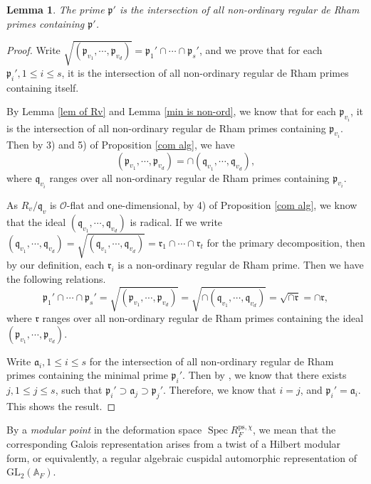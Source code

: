 \documentclass[a4paper, 12pt]{amsart}
\newtheorem{lem}[thm]{Lemma}
\DeclareMathOperator{\Spec}{Spec}
\def\ps{\mathrm{ps}}
\newcommand{\A}{\mathbb{A}}
\newcommand{\GL}{\mathrm{GL}}
\newcommand{\cO}{\mathcal{O}}
\newcommand{\kq}{\mathfrak{q}}
\newcommand{\kp}{\mathfrak{p}}
\begin{document}
    \begin{lem}\label{non-ord regular de Rham}
    	The prime $\kp'$ is the intersection of all non-ordinary regular de Rham primes containing $\kp'$.
    \end{lem}
    
    \begin{proof}
    	Write $\sqrt{(\kp_{v_1}, \cdots, \kp_{v_d})} = \kp_1' \cap \cdots \cap \kp_s'$, and we prove that for each $\kp_i', 1 \le i \le s$, it is the intersection of all non-ordinary regular de Rham primes containing itself.
    	
    	By Lemma \ref{lem of Rv} and Lemma  \ref{min is non-ord}, we know that for each $ \kp_{v_i}$, it is the intersection of all non-ordinary regular de Rham primes containing $ \kp_{v_i}$. Then by 3) and 5) of Proposition \ref{com alg}, we have $$
    	(\kp_{v_1}, \cdots, \kp_{v_d})= \cap (\kq_{v_1}, \cdots, \kq_{v_d}),$$
    	where $\kq_{v_i}$ ranges over all non-ordinary regular de Rham primes containing $ \kp_{v_i}$.
    	
    	As $R_v/\kq_v$ is $\cO$-flat and one-dimensional, by 4) of Proposition \ref{com alg}, we know that the ideal $(\kq_{v_1},  \cdots, \kq_{v_d})$ is radical. If we write $(\kq_{v_1},  \cdots, \kq_{v_d}) =\sqrt{(\kq_{v_1},  \cdots, \kq_{v_d})}= \mathfrak{r}_1 \cap \cdots \cap \mathfrak{r}_t$ for the primary decomposition, then by our definition, each $\mathfrak{r}_i$ is a non-ordinary regular de Rham prime. Then we have the following relations.
    	$$\kp_1' \cap \cdots \cap \kp_s'=\sqrt{(\kp_{v_1}, \cdots, \kp_{v_d})}=\sqrt{\cap (\kq_{v_1}, \cdots, \kq_{v_d})}= \sqrt{\cap \mathfrak{r}} = \cap \mathfrak{r},$$
        where $\mathfrak{r}$ ranges over all non-ordinary regular de Rham primes containing the ideal $(\kp_{v_1}, \cdots, \kp_{v_d})$.
        
        Write $\mathfrak{a}_i, 1 \le i \le s$ for the intersection of all non-ordinary regular de Rham primes containing the minimal prime $\kp_i'$. Then by \cite[Lemma 10.15.1]{stacks-project}, we know that there exists $j, 1 \le j \le s$, such that $\kp_i' \supset \mathfrak{a}_j \supset \kp_j'$. Therefore, we know that $i=j$, and $\kp_i'=\mathfrak{a}_i$. This shows the result.
    \end{proof}
    
    By a \textit{modular point} in the deformation space $\Spec R_{F}^{\ps, \chi}$, we mean that the corresponding Galois representation arises from a twist of a Hilbert modular form, or equivalently, a regular algebraic cuspidal automorphic representation of $\GL_2(\A_F)$.
    
\end{document}
